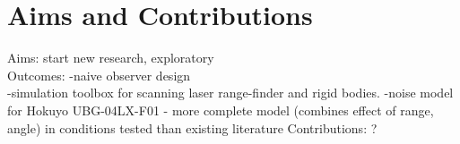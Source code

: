\chapter*{Aims and Contributions}

Aims: start new research, exploratory\\
Outcomes:
-naive observer design\\
-simulation toolbox for scanning laser range-finder and rigid bodies.
-noise model for Hokuyo UBG-04LX-F01 - more complete model (combines effect of range, angle) in conditions tested than existing literature
Contributions: ?